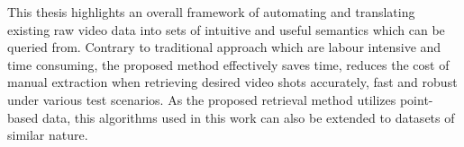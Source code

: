 This thesis highlights an overall framework of automating and translating existing raw video data into sets of intuitive and useful semantics which can be queried from. Contrary to traditional approach which are labour intensive and time consuming, the proposed method effectively saves time, reduces the cost of manual extraction when retrieving desired video shots accurately, fast and robust under various test scenarios. As the proposed retrieval method utilizes point-based data, this algorithms used in this work can also be extended to datasets of similar nature.


